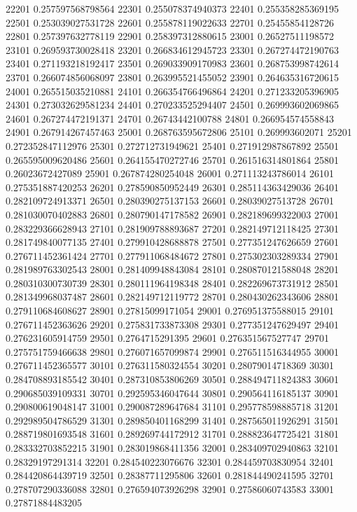 {22201 0.257597568798564
22301 0.255078374940373
22401 0.255358285369195
22501 0.253039027531728
22601 0.255878119022633
22701 0.25455854128726
22801 0.257397632778119
22901 0.258397312880615
23001 0.26527511198572
23101 0.269593730028418
23201 0.266834612945723
23301 0.267274472190763
23401 0.271193218192417
23501 0.269033909170983
23601 0.268753998742614
23701 0.266074856068097
23801 0.263995521455052
23901 0.264635316720615
24001 0.265515035210881
24101 0.266354766496864
24201 0.271233205396905
24301 0.273032629581234
24401 0.270233525294407
24501 0.269993602069865
24601 0.267274472191371
24701 0.26743442100788
24801 0.266954574558843
24901 0.267914267457463
25001 0.268763595672806
25101 0.269993602071
25201 0.272352847112976
25301 0.272712731949621
25401 0.271912987867892
25501 0.265595009620486
25601 0.264155470272746
25701 0.261516314801864
25801 0.26023672427089
25901 0.267874280254048
26001 0.271113243786014
26101 0.275351887420253
26201 0.278590850952449
26301 0.285114363429036
26401 0.282109724913371
26501 0.280390275137153
26601 0.28039027513728
26701 0.281030070402883
26801 0.280790147178582
26901 0.282189699322003
27001 0.283229366628943
27101 0.281909788893687
27201 0.282149712118425
27301 0.281749840077135
27401 0.279910428688878
27501 0.277351247626659
27601 0.276711452361424
27701 0.277911068484672
27801 0.275302303289334
27901 0.281989763302543
28001 0.281409948843084
28101 0.280870121588048
28201 0.280310300730739
28301 0.280111964198348
28401 0.282269673731912
28501 0.281349968037487
28601 0.282149712119772
28701 0.280430262343606
28801 0.279110684608627
28901 0.27815099171054
29001 0.276951375588015
29101 0.276711452363626
29201 0.275831733873308
29301 0.277351247629497
29401 0.276231605914759
29501 0.2764715291395
29601 0.276351567527747
29701 0.275751759466638
29801 0.276071657099874
29901 0.276511516344955
30001 0.276711452365577
30101 0.276311580324554
30201 0.28079014718369
30301 0.284708893185542
30401 0.287310853806269
30501 0.288494711824383
30601 0.290685039109331
30701 0.292595346047644
30801 0.290564116185137
30901 0.290800619048147
31001 0.290087289647684
31101 0.295778598885718
31201 0.292989504786529
31301 0.289850401168299
31401 0.287565011926291
31501 0.288719801693548
31601 0.289269744172912
31701 0.288823647725421
31801 0.283332703852215
31901 0.283019868411356
32001 0.283409702940863
32101 0.28329197291314
32201 0.284540223076676
32301 0.284459703830954
32401 0.284420864439719
32501 0.28387711295806
32601 0.281844490241595
32701 0.278707290336088
32801 0.276594073926298
32901 0.27586060743583
33001 0.27871884483205
}
